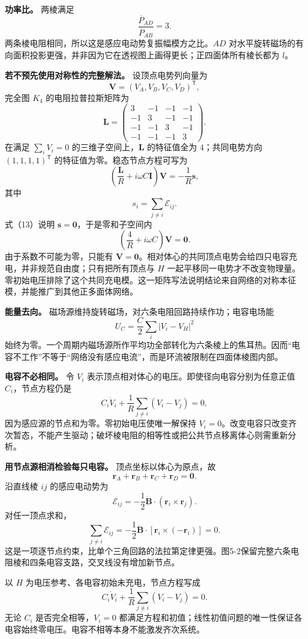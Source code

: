 \documentclass[12pt,a4paper,UTF8]{ctexart}
\begin{document}
\textbf{功率比。} 两棱满足 \[
\frac{\overline P_{AD}}{\overline P_{AB}}=3.
\] 两条棱电阻相同，所以这是感应电动势复振幅模方之比。\(AD\)
对水平旋转磁场的有向面积投影更强，并非因为它在透视图上画得更长；正四面体所有棱长都为
\(l\)。

\textbf{若不预先使用对称性的完整解法。} 设顶点电势列向量为 \[
\bm V=(V_A,V_B,V_C,V_D)^{\mathsf T},
\] 完全图 \(K_4\) 的电阻拉普拉斯矩阵为 \[
\bm L=
\begin{pmatrix}
3&-1&-1&-1\\
-1&3&-1&-1\\
-1&-1&3&-1\\
-1&-1&-1&3
\end{pmatrix}.
\] 在满足 \(\sum_iV_i=0\) 的三维子空间上，\(\bm L\) 的特征值全为
\(4\)；共同电势方向 \((1,1,1,1)^{\mathsf T}\)
的特征值为零。稳态节点方程可写为 \[
\left(\frac{\bm L}{R}+i\omega C\bm I\right)\bm V
=-\frac1R\bm s,
\] 其中 \[
s_i=\sum_{j\ne i}\mathcal E_{ij}.
\] 式（13）说明 \(\bm s=\bm0\)，于是零和子空间内 \[
\left(\frac4R+i\omega C\right)\bm V=\bm0.
\] 由于系数不可能为零，只能有
\(\bm V=\bm0\)。相对体心的共同顶点电势会给四只电容充电，并非规范自由度；只有把所有顶点与
\(H\)
一起平移同一电势才不改变物理量。零初始电压排除了这个共同充电模。这一矩阵写法说明结论来自网络的对称本征模，并能推广到其他正多面体网络。

\textbf{能量去向。}
磁场源维持旋转磁场，对六条电阻回路持续作功；电容电场能 \[
U_C=\frac C2\sum_i|V_i-V_H|^2
\]
始终为零。一个周期内磁场源所作平均功全部转化为六条棱上的焦耳热。因而``电容不工作''不等于``网络没有感应电流''，而是环流被限制在四面体棱图内部。

\textbf{电容不必相同。} 令 \(V_i\)
表示顶点相对体心的电压。即使径向电容分别为任意正值 \(C_i\)，节点方程仍是
\[
C_i\dot V_i+\frac1R\sum_{j\ne i}(V_i-V_j)=0,
\] 因为感应源的节点和为零。零初始电压使唯一解保持
\(V_i=0\)。改变电容只改变齐次暂态，不能产生驱动；破坏棱电阻的相等性或把公共节点移离体心则需重新分析。

\textbf{用节点源相消检验每只电容。} 顶点坐标以体心为原点，故 \[
\bm r_A+\bm r_B+\bm r_C+\bm r_D=\bm0.
\] 沿直线棱 \(ij\) 的感应电动势为 \[
\mathcal E_{ij}=-\frac12\dot{\bm B}\cdot(\bm r_i\times\bm r_j).
\] 对任一顶点求和， \[
\sum_{j\ne i}\mathcal E_{ij}
=-\frac12\dot{\bm B}\cdot\left[\bm r_i\times(-\bm r_i)\right]=0.
\]
这是一项逐节点约束，比单个三角回路的法拉第定律更强。图5-2保留完整六条电阻棱和四条电容支路，交叉线没有增加新节点。

以 \(H\) 为电压参考、各电容初始未充电，节点方程写成 \[
C_i\dot V_i+\frac1R\sum_{j\ne i}(V_i-V_j)=0.
\] 无论 \(C_i\) 是否完全相等，\(V_i=0\)
都满足方程和初值；线性初值问题的唯一性保证各电容始终零电压。电容不相等本身不能激发齐次系统。
\end{document}
